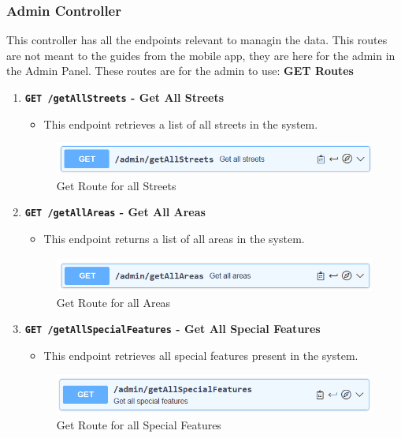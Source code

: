     \subsubsection{Admin Controller}
    This controller has all the endpoints relevant to managin the data. This routes are not meant to the guides from the mobile app, they are here for the admin in the Admin Panel. These routes are for the admin to use: \newline \newline
    \textbf{GET Routes}
    \begin{enumerate}
        \item \textbf{\texttt{GET /getAllStreets} - Get All Streets}
        \begin{itemize}
            \item This endpoint retrieves a list of all streets in the system.
        \end{itemize} 
        \begin{figure} [H]
            \centering
            \includegraphics [width=1\textwidth] {images/andreas/praxis/getAllStreets.png}
            \caption{Get Route for all Streets}
        \end{figure}

        \item \textbf{\texttt{GET /getAllAreas} - Get All Areas}
        \begin{itemize}
            \item This endpoint returns a list of all areas in the system.
        \end{itemize} 
        \begin{figure} [H]
            \centering
            \includegraphics [width=1\textwidth] {images/andreas/praxis/getAllAreas.png}
            \caption{Get Route for all Areas}
        \end{figure}

        \item \textbf{\texttt{GET /getAllSpecialFeatures} - Get All Special Features}
        \begin{itemize}
            \item This endpoint retrieves all special features present in the system.
        \end{itemize} 
        \begin{figure} [H]
            \centering
            \includegraphics [width=1\textwidth] {images/andreas/praxis/getAllSF.png}
            \caption{Get Route for all Special Features}
        \end{figure}
    \end{enumerate}

